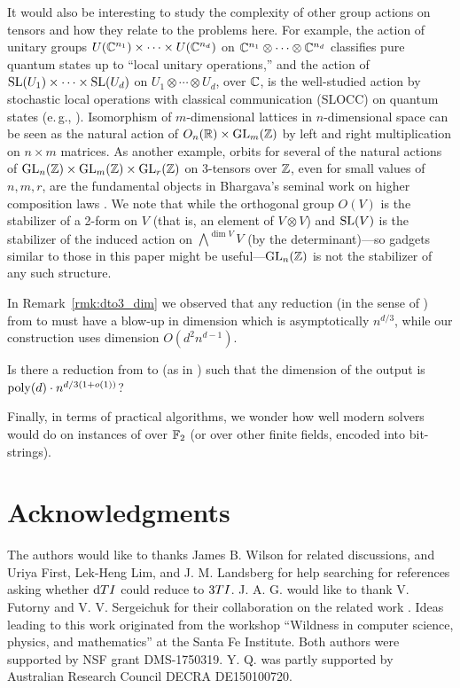 \documentclass[11pt]{article}
\begin{document}
It would also be interesting to study the complexity of other group actions on 
tensors and how they relate to the problems here. For example, the action of 
unitary groups $U(\mathbb{C}^{n_1}) \times \dotsb \times U(\mathbb{C}^{n_d})$ on $\mathbb{C}^{n_1} \otimes 
\dotsb \otimes \mathbb{C}^{n_d}$ classifies pure quantum states up to ``local unitary 
operations,'' and the action of $\mathrm{SL}(U_1) \times \dotsb \times \mathrm{SL}(U_d)$ on $U_1 
\otimes \dotsb \otimes U_d$, over $\mathbb{C}$, is the well-studied action by stochastic 
local operations with classical communication (SLOCC) on quantum states (e.\,g., 
\cite{gourWallach, miyake, SLOCC4}). Isomorphism of $m$-dimensional lattices in 
$n$-dimensional space can be seen as the natural action of $O_n(\mathbb{R}) \times 
\mathrm{GL}_m(\mathbb{Z})$ by left and right multiplication on $n \times m$ matrices. As another 
example, orbits for several of the natural actions of $\mathrm{GL}_n(\mathbb{Z}) \times \mathrm{GL}_m(\mathbb{Z}) 
\times \mathrm{GL}_r(\mathbb{Z})$ on 3-tensors over $\mathbb{Z}$, even for small values of $n,m,r$, are 
the fundamental objects in Bhargava's seminal work on higher composition laws 
\cite{bhargava,bhargava2,bhargava3,bhargava4}. We note that while the orthogonal 
group $O(V)$ is the stabilizer of a 2-form on $V$ (that is, an element of $V 
\otimes V$) and $\mathrm{SL}(V)$ is the stabilizer of the induced action on 
$\bigwedge^{\dim V} V$ (by the determinant)---so gadgets similar to those in this 
paper might be useful---$\mathrm{GL}_n(\mathbb{Z})$ is not the stabilizer of any such structure. 

In Remark~\ref{rmk:dto3_dim} we observed that any reduction (in the sense of 
) from \DeeTI to \ThreeTI must have a blow-up in dimension 
which is asymptotically $n^{d/3}$, while our construction uses dimension $O(d^2 
n^{d-1})$.

\begin{question}
Is there a reduction from \DeeTI to \ThreeTI (as in ) such that the dimension of the output is $\mathrm{poly}(d) \cdot n^{d/3(1 + o(1))}$? 
\end{question}

Finally, in terms of practical algorithms, we wonder how well modern  solvers would do on instances of \ThreeTIlong over $\mathbb{F}_2$ (or over other finite fields, encoded into bit-strings). 

\section*{Acknowledgments}
The authors would like to thanks James B. Wilson for related discussions, and Uriya First, Lek-Heng Lim, and J. M. Landsberg for help searching for references asking whether $\DeeTI$ could reduce to ${\sc 3TI}$.
J. A. G. would like to thank V. Futorny and V. V. Sergeichuk for their collaboration on the related work \cite{FGS19}.
Ideas leading to this work originated from the workshop ``Wildness
in computer science, physics, and mathematics'' at the Santa Fe Institute. 
Both authors were supported by NSF grant DMS-1750319. Y. Q. was partly 
supported by Australian Research Council DECRA DE150100720.
\end{document}
